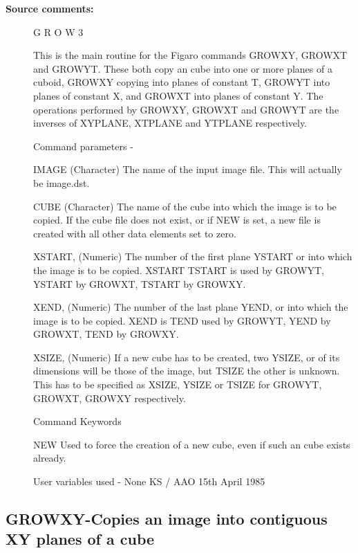 \begin{description}
\begin{description}
\item [\textbf{Source comments:}]
\begin{terminalv}
 G R O W 3

 This is the main routine for the Figaro commands GROWXY, GROWXT
 and GROWYT.  These both copy an cube into one or more
 planes of a cuboid, GROWXY copying into planes of constant T,
 GROWYT into planes of constant X, and GROWXT into planes of
 constant Y.  The operations performed by GROWXY, GROWXT and
 GROWYT are the inverses of XYPLANE, XTPLANE and YTPLANE
 respectively.

 Command parameters -

 IMAGE       (Character) The name of the input image file.
             This will actually be image.dst.

 CUBE        (Character) The name of the cube into which the
             image is to be copied.  If the cube file does
             not exist, or if NEW is set, a new file is
             created with all other data elements set to zero.

 XSTART,     (Numeric) The number of the first plane
 YSTART or   into which the image is to be copied.  XSTART
 TSTART      is used by GROWYT, YSTART by GROWXT, TSTART by GROWXY.

 XEND,       (Numeric) The number of the last plane
 YEND, or    into which the image is to be copied.  XEND is
 TEND        used by GROWYT, YEND by GROWXT, TEND by GROWXY.

 XSIZE,      (Numeric) If a new cube has to be created, two
 YSIZE, or   of its dimensions will be those of the image, but
 TSIZE       the other is unknown.  This has to be specified as
             XSIZE, YSIZE or TSIZE for GROWYT, GROWXT, GROWXY
             respectively.

 Command Keywords

 NEW         Used to force the creation of a new cube, even if
             such an cube exists already.

 User variables used -  None
                                         KS / AAO 15th April 1985
\end{terminalv}
\end{description}
\subsection{GROWXY-\label{GROWXY}Copies an image into contiguous XY planes of a cube}
\begin{description}


\end{description}
\end{description}
